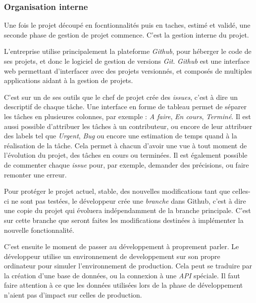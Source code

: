 \bigskip

\subsubsection{Organisation interne}\label{organisation-interne}

\bigskip

Une fois le projet découpé en focntionnalités puis en taches, estimé et
validé, une seconde phase de gestion de projet commence. C'est la
gestion interne du projet.

L'entreprise utilise principalement la plateforme \emph{Github}, pour
héberger le code de ses projets, et donc le logiciel de gestion de
versions \emph{Git}. \emph{Github} est une interface web permettant
d'interfacer avec des projets versionnés, et composés de multiples
applications aidant à la gestion de projets.

\bigskip

C'est sur un de ses outils que le chef de projet crée des \emph{issues},
c'est à dire un descriptif de chaque tâche. Une interface en forme de
tableau permet de séparer les tâches en plusieures colonnes, par exemple
: \emph{A faire}, \emph{En cours}, \emph{Terminé}. Il est aussi possible
d'attribuer les tâches à un contributeur, ou encore de leur attribuer
des labels tel que \emph{Urgent}, \emph{Bug} ou encore une estimation de
temps quand à la réalisation de la tâche. Cela permet à chacun d'avoir
une vue à tout moment de l'évolution du projet, des tâches en cours ou
terminées. Il est également possible de commenter chaque \emph{issue}
pour, par exemple, demander des précisions, ou faire remonter une
erreur.

\bigskip

Pour protéger le projet actuel, stable, des nouvelles modifications tant
que celles-ci ne sont pas testées, le développeur crée une
\emph{branche} dans Github, c'est à dire une copie du projet qui
évoluera indépendamment de la branche principale. C'est sur cette
branche que seront faites les modifications destinées à implémenter la
nouvelle fonctionnalité.

\bigskip

C'est ensuite le moment de passer au développement à proprement parler.
Le développeur utilise un environnement de developpement sur son propre
ordinateur pour simuler l'environnement de production. Cela peut se
traduire par la création d'une base de données, ou la connexion à une
\emph{API} spéciale. Il faut faire attention à ce que les données
utilisées lors de la phase de développement n'aient pas d'impact sur
celles de production.

